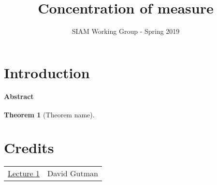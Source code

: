 \documentclass{amsproc}
\title{Concentration of measure}
\author{SIAM Working Group - Spring 2019}
\newtheorem{theorem}{Theorem}
\newcommand{\fref}[2]{\hyperref[#2]{#1 \ref*{#2}}}
\begin{document}
\maketitle
\tableofcontents


\section{Introduction}
\label{sec:introduction}
\paragraph{\textbf{Abstract}}
\lipsum[1]

\begin{theorem}[Theorem name]
\label{thm:reference-name}
\end{theorem}


\appendix
\newpage
\section*{Credits}
\begin{tabular}{ll}
	\fref{Lecture}{sec:introduction}
	&David Gutman
\end{tabular}
\end{document}
